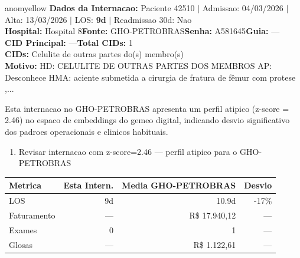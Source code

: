 \documentclass[a4paper,10pt]{article}
\begin{document}
\begin{anomalycard}[Internacao 167679 | GHO-PETROBRAS | MODERADO (z=2.46)]{anomyellow}
\textbf{Dados da Internacao:} Paciente 42510 $\mid$ Admissao: 04/03/2026 $\mid$ Alta: 13/03/2026 $\mid$ LOS: \textbf{9d} $\mid$ Readmissao 30d: Nao\\
\textbf{Hospital:} Hospital 8\quad\textbf{Fonte:} GHO-PETROBRAS\quad\textbf{Senha:} A581645\quad\textbf{Guia:} ---\\
\textbf{CID Principal:} {\small ---}\quad\textbf{Total CIDs:} 1\\

\textbf{CIDs:} {\scriptsize Celulite de outras partes do(s) membro(s)}\\

\textbf{Motivo:} {\scriptsize HD: CELULITE DE OUTRAS PARTES DOS MEMBROS  AP: Desconhece  HMA: aciente submetida a cirurgia de fratura de fêmur com protese ,...}\\

\vspace{2pt}\begin{tcolorbox}[colback=severityred!20,colframe=anomyellow,title={\textbf{Interpretacao de Negocio}},fonttitle=\bfseries\small,left=4pt,right=4pt,top=3pt,bottom=3pt]
{\small Esta internacao no GHO-PETROBRAS apresenta um perfil atipico (z-score = 2.46) no espaco de embeddings do gemeo digital, indicando desvio significativo dos padroes operacionais e clinicos habituais.}
\end{tcolorbox}
\begin{tcolorbox}[colback=severityyellow!30,colframe=anomorange,title={\textbf{Recomendacoes Especificas}},fonttitle=\bfseries\small,left=4pt,right=4pt,top=3pt,bottom=3pt]
\begin{enumerate}[nosep,leftmargin=16pt]
\item {\small Revisar internacao com z-score=2.46 --- perfil atipico para o GHO-PETROBRAS}
\end{enumerate}
\end{tcolorbox}
\begin{center}\begin{tabular}{l r r r}\toprule\textbf{Metrica} & \textbf{Esta Intern.} & \textbf{Media GHO-PETROBRAS} & \textbf{Desvio} \\\midrule
LOS & 9d & 10.9d & -17\% \\
Faturamento & --- & R\$ 17.940,12 & --- \\
Exames & 0 & 1 & --- \\
Glosas & --- & R\$ 1.122,61 & --- \\
\bottomrule\end{tabular}\end{center}


\end{anomalycard}
\end{document}
